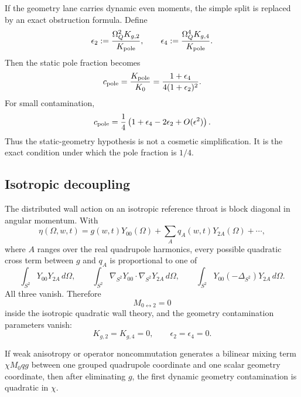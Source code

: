 If the geometry lane carries dynamic even moments, the simple split is replaced by an exact obstruction formula.  Define
\begin{equation}
\label{eq:part04-eps2-eps4}
\epsilon_2:=\frac{\Omega_Q^2K_{g,2}}{K_{\rm pole}},
\qquad
\epsilon_4:=\frac{\Omega_Q^4K_{g,4}}{K_{\rm pole}}.
\end{equation}
Then the static pole fraction becomes
\begin{equation}
\label{eq:part04-cpole-dynamic-geometry}
c_{\rm pole}
=
\frac{K_{\rm pole}}{K_0}
=
\frac{1+\epsilon_4}{4(1+\epsilon_2)^2}.
\end{equation}
For small contamination,
\begin{equation}
\label{eq:part04-cpole-small-expansion}
c_{\rm pole}
=
\frac14\left(1+\epsilon_4-2\epsilon_2+O(\epsilon^2)\right).
\end{equation}
Thus the static-geometry hypothesis is not a cosmetic simplification.  It is the exact condition under which the pole fraction is \(1/4\).

\subsection{Isotropic decoupling}
\label{subsec:part04-isotropic-decoupling}

The distributed wall action on an isotropic reference throat is block diagonal in angular momentum.  With
\begin{equation}
\eta(\Omega,w,t)
=
g(w,t)Y_{00}(\Omega)+\sum_A q_A(w,t)Y_{2A}(\Omega)+\cdots,
\end{equation}
where \(A\) ranges over the real quadrupole harmonics, every possible quadratic cross term between \(g\) and \(q_A\) is proportional to one of
\begin{equation}
\int_{S^2}Y_{00}Y_{2A}\,d\Omega,
\qquad
\int_{S^2}\nabla_{S^2}Y_{00}\cdot\nabla_{S^2}Y_{2A}\,d\Omega,
\qquad
\int_{S^2}Y_{00}(-\Delta_{S^2})Y_{2A}\,d\Omega.
\end{equation}
All three vanish.  Therefore
\begin{equation}
\label{eq:part04-l0-l2-block-zero}
M_{0\leftrightarrow2}=0
\end{equation}
inside the isotropic quadratic wall theory, and the geometry contamination parameters vanish:
\begin{equation}
\label{eq:part04-eps-zero-isotropic}
K_{g,2}=K_{g,4}=0,
\qquad
\epsilon_2=\epsilon_4=0.
\end{equation}

\begin{proposition}
\label{prop:part04-second-order-geometry-contamination}
If weak anisotropy or operator noncommutation generates a bilinear mixing term \(\chi M_0qg\) between one grouped quadrupole coordinate and one scalar geometry coordinate, then after eliminating \(g\), the first dynamic geometry contamination is quadratic in \(\chi\).
\end{proposition}

